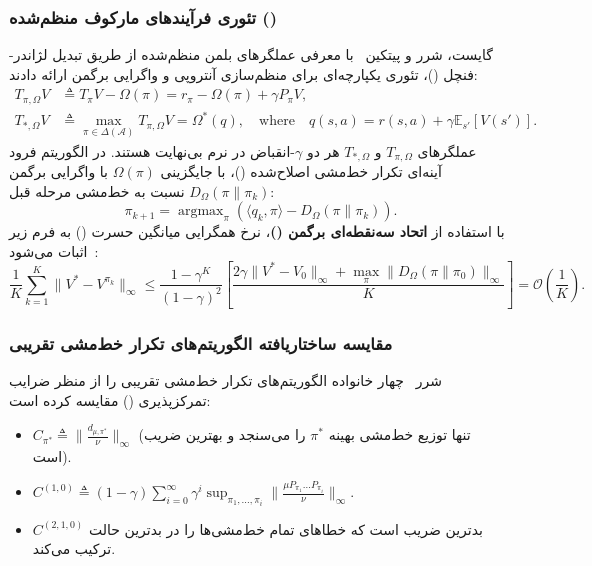 \subsubsection*{تئوری فرآیندهای مارکوف منظم‌شده ()}
گایست، شرر و پیتکین~\cite{geist2019theory} با معرفی عملگرهای بلمن منظم‌شده از طریق تبدیل لژاندر-فنچل ()، تئوری یکپارچه‌ای برای منظم‌سازی آنتروپی و واگرایی برگمن ارائه دادند:
\begin{align}
T_{\pi, \Omega} V &\triangleq T_\pi V - \Omega(\pi) = r_\pi - \Omega(\pi) + \gamma P_\pi V, \\
T_{*,\Omega} V &\triangleq \max_{\pi \in \Delta(\mathcal{A})} T_{\pi, \Omega} V = \Omega^*(q), \quad \text{where} \quad q(s, a) = r(s, a) + \gamma \mathbb{E}_{s'}[V(s')].
\end{align}
عملگرهای $T_{\pi, \Omega}$ و $T_{*,\Omega}$ هر دو $\gamma$-انقباض در نرم بی‌نهایت هستند. در الگوریتم فرود آینه‌ای تکرار خط‌مشی اصلاح‌شده ()، با جایگزینی $\Omega(\pi)$ با واگرایی برگمن $D_\Omega(\pi \parallel \pi_k)$ نسبت به خط‌مشی مرحله قبل:
\begin{equation}
\pi_{k+1} = \operatorname{argmax}_\pi \left( \langle q_k, \pi \rangle - D_\Omega(\pi \parallel \pi_k) \right).
\end{equation}
با استفاده از \textbf{اتحاد سه‌نقطه‌ای برگمن ()}، نرخ همگرایی میانگین حسرت () به فرم زیر اثبات می‌شود~\cite{geist2019theory}:
\begin{equation}
\frac{1}{K} \sum_{k=1}^K \|V^* - V^{\pi_k}\|_\infty \le \frac{1 - \gamma^K}{(1 - \gamma)^2} \left[ \frac{2\gamma \|V^* - V_0\|_\infty + \max_\pi \|D_\Omega(\pi \parallel \pi_0)\|_\infty}{K} \right] = \mathcal{O}\left(\frac{1}{K}\right).
\end{equation}

\subsubsection*{مقایسه ساختاریافته الگوریتم‌های تکرار خط‌مشی تقریبی}
شرر~\cite{scherrer2014approximate} چهار خانواده الگوریتم‌های تکرار خط‌مشی تقریبی را از منظر ضرایب تمرکزپذیری () مقایسه کرده است:
\begin{itemize}
    \item $C_{\pi^*} \triangleq \| \frac{d_{\mu, \pi^*}}{\nu} \|_\infty$ (تنها توزیع خط‌مشی بهینه $\pi^*$ را می‌سنجد و بهترین ضریب است).
    \item $C^{(1, 0)} \triangleq (1 - \gamma) \sum_{i=0}^\infty \gamma^i \sup_{\pi_1, \dots, \pi_i} \| \frac{\mu P_{\pi_1} \dots P_{\pi_i}}{\nu} \|_\infty$.
    \item $C^{(2, 1, 0)}$ بدترین ضریب است که خطاهای تمام خط‌مشی‌ها را در بدترین حالت ترکیب می‌کند.
\end{itemize}

